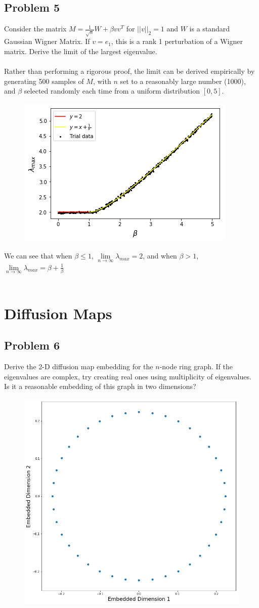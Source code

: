 \documentclass{amsart}
\begin{document}
	\subsection{Problem 5}
	Consider the matrix $M = \frac{1}{\sqrt{n}}W + \beta vv^T$ for $||v||_2=1$ and $W$ is a standard Gaussian Wigner Matrix. If $v=e_1$, this is a rank 1 perturbation of a Wigner matrix. Derive the limit of the largest eigenvalue.
	\\\\
	Rather than performing a rigorous proof, the limit can be derived empirically by generating 500 samples of $M$, with $n$ set to a reasonably large number (1000), and $\beta$ selected randomly each time from a uniform distribution $[0,5]$. 
	\begin{figure}[h!]
		\centering
		\includegraphics[scale=0.55]{problem_5.png}
	\end{figure}
	
	We can see that when $\beta \leq 1$, $\lim\limits_{n \rightarrow \infty} \lambda_{max} = 2$, and when $\beta > 1$, $\lim\limits_{n \rightarrow \infty}\lambda_{max} = \beta + \frac{1}{\beta}$
	\\\\
	\section{Diffusion Maps}
	\subsection{Problem 6}
	Derive the 2-D diffusion map embedding for the $n$-node ring graph. If the eigenvalues are complex, try creating real ones using multiplicity of eigenvalues. Is it a reasonable embedding of this graph in two dimensions?
	
	\begin{figure}[h!]
		\centering
		\includegraphics[width=0.6\linewidth]{diffmap.png}
	\end{figure}
\end{document}
